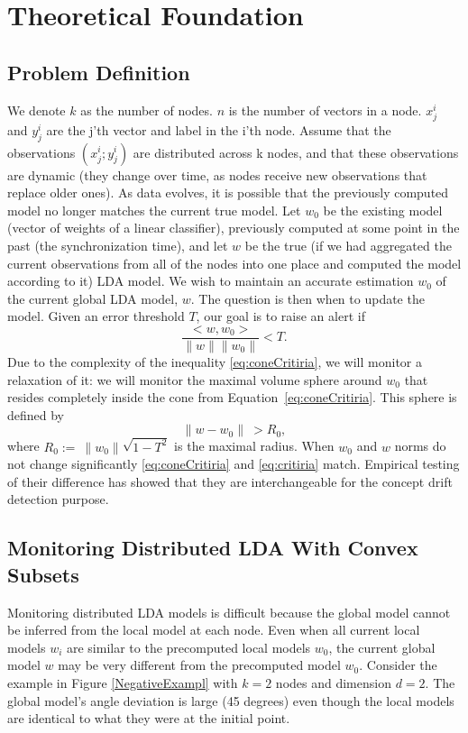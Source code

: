\documentclass[11pt,twocolumn,varwidth=true,a4paper,fleqn]{article}
\begin{document}
 
\section{Theoretical Foundation}
\subsection{Problem Definition}
We denote $k$ as the number of nodes.
$n$ is the number of vectors in a node.
$x^i_j$ and $y^i_j$ are the j'th vector and label in the i'th node.
Assume that the observations ${(x^i_j; y^i_j)}$ are distributed across k nodes, 
and that these observations are dynamic (they change over time, as nodes receive 
new observations that replace older ones). 
As data evolves, it is possible that the previously computed model no longer 
matches the current true model. 
Let $w_0$ be the existing model (vector of weights of a linear classifier), 
previously computed at some point in the past (the synchronization time), 
and let $w$ be the true (if we had aggregated the current observations 
from all of the nodes into one place and computed the model according to it) LDA
model.
We wish to maintain an accurate estimation $w_0$ of the current global LDA model, $w$. 
The question is then when to update the model.
Given an error threshold $T$, our goal is to raise an alert if
\begin{equation} \label{eq:coneCritiria}
\frac{<w,w_0>}{\parallel w \parallel \parallel w_0 \parallel}  < T.
\end{equation}
Due to the complexity of the inequality \ref{eq:coneCritiria},
we will monitor a relaxation of it: we will monitor the maximal volume sphere
around $w_0$ that resides completely inside the cone from Equation~\ref{eq:coneCritiria}. 
This sphere is defined by
\begin{equation} \label{eq:critiria}
\parallel w-w_0 \parallel \  >  R_0,
\end{equation}
where $R_0 := \  \parallel w_0 \parallel \sqrt{1-T^2}$ is the maximal radius.
When $w_0$ and $w$ norms do not change significantly \ref{eq:coneCritiria} and
\ref{eq:critiria} match. Empirical testing of their difference has showed that
they are interchangeable for the concept drift detection purpose.

\subsection{Monitoring Distributed LDA With Convex Subsets}
Monitoring distributed LDA models is difficult because the
global model cannot be inferred from the local model at each
node. Even when all current local models $w_i$ are similar to the precomputed
local models $w_0$, the current global model $w$ may
be very different from the precomputed model $w_0$. Consider
the example in Figure \ref{NegativeExampl} with $k = 2$ nodes and dimension $d =
2$. The global model's angle deviation is large (45 degrees) even
though the local models are identical to what they were at the initial
point.
\end{document}
